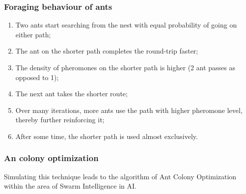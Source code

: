 \subsubsection{Foraging behaviour of ants}
\begin{enumerate}
    \item Two ants start searching from the nest with equal probability of going on either path;
    \item The ant on the shorter path completes the round-trip faster;
    \item The density of pheromones on the shorter path is higher (2 ant passes as opposed to 1);
    \item The next ant takes the shorter route;
    \item Over many iterations, more ants use the path with higher pheromone level, thereby further reinforcing it;
    \item After some time, the shorter path is used almost exclusively.
\end{enumerate}

\subsubsection{An colony optimization}
Simulating this technique leads to the algorithm of Ant Colony Optimization within the area of Swarm Intelligence in AI.